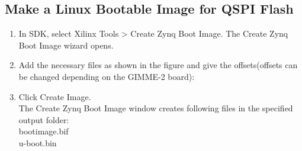 \subsection{Make a Linux Bootable Image for QSPI Flash}
\label{Make_a_Linux_Bootable_Image_for_QSPI_Flashl}
\begin{enumerate}
\item In SDK, select Xilinx Tools > Create Zynq Boot Image. The Create Zynq Boot Image wizard opens. 
\item Add the necessary files as shown in the figure and give the offsets(offsets can be changed depending on the GIMME-2 board):\newline

\item Click Create Image. \\
The Create Zynq Boot Image window creates following files in the specified output folder: \\
 bootimage.bif \\
 u-boot.bin
\end{enumerate}
